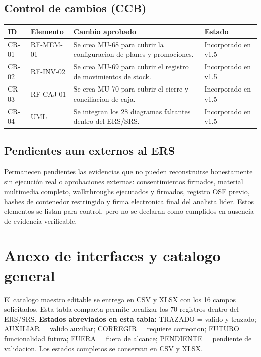 \documentclass[11pt,a4paper,twoside]{article}
\begin{document}
\subsection{Control de cambios (CCB)}
\begin{tabularx}{\textwidth}{l p{2.3cm} X p{2.0cm}}
\toprule ID & Elemento & Cambio aprobado & Estado \\ \midrule
CR-01 & RF-MEM-01 & Se crea MU-68 para cubrir la configuracion de planes y promociones. & Incorporado en v1.5 \\
CR-02 & RF-INV-02 & Se crea MU-69 para cubrir el registro de movimientos de stock. & Incorporado en v1.5 \\
CR-03 & RF-CAJ-01 & Se crea MU-70 para cubrir el cierre y conciliacion de caja. & Incorporado en v1.5 \\
CR-04 & UML & Se integran los 28 diagramas faltantes dentro del ERS/SRS. & Incorporado en v1.5 \\
\bottomrule
\end{tabularx}

\subsection{Pendientes aun externos al ERS}
Permanecen pendientes las evidencias que no pueden reconstruirse honestamente sin ejecución real o aprobaciones externas: consentimientos firmados, material multimedia completo, walkthroughs ejecutados y firmados, registro OSF previo, hashes de contenedor restringido y firma electronica final del analista lider. Estos elementos se listan para control, pero no se declaran como cumplidos en ausencia de evidencia verificable.
\section{Anexo de interfaces y catalogo general}
El catalogo maestro editable se entrega en CSV y XLSX con los 16 campos solicitados. Esta tabla compacta permite localizar los 70 registros dentro del ERS/SRS.
\textbf{Estados abreviados en esta tabla:} TRAZADO = valido y trazado; AUXILIAR = valido auxiliar; CORREGIR = requiere correccion; FUTURO = funcionalidad futura; FUERA = fuera de alcance; PENDIENTE = pendiente de validacion. Los estados completos se conservan en CSV y XLSX.
\end{document}
